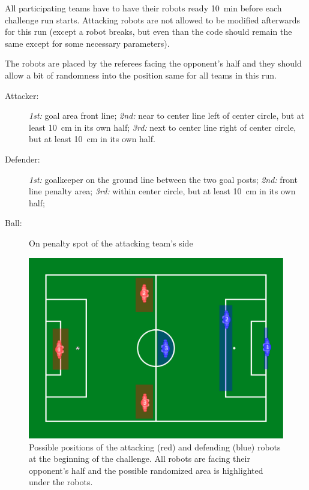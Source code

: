 All participating teams have to have their robots ready \qty{10}{\minute} before each challenge run starts. Attacking robots are not allowed to be modified afterwards for this run (except a robot breaks, but even than the code should remain the same except for some necessary parameters).

The robots are placed by the referees facing the opponent's half and they should allow a bit of randomness into the position same for all teams in this run.
\begin{description}
	\item[Attacker:] \textit{1st:} goal area front line; \textit{2nd:} near to center line left of center circle, but at least \qty{10}{\cm} in its own half; \textit{3rd:} next to center line right of center circle, but at least \qty{10}{\cm} in its own half.
	\item[Defender:] \textit{1st:} goalkeeper on the ground line between the two goal posts; \textit{2nd:} front line penalty area; \textit{3rd:} within center circle, but at least \qty{10}{\cm} in its own half; 
	\item[Ball:] On penalty spot of the attacking team's side
\end{description}

\begin{figure}[hb!]
	\begin{center}
		\leavevmode
		\includegraphics[width=1\columnwidth]{figs/dbhc_initial.pdf}
		\caption{Possible positions of the {\color{red}attacking (red)} and {\color{blue}defending (blue)} robots at the beginning of the challenge. All robots are facing their opponent's half and the possible randomized area is highlighted under the robots.}
		\label{fig:ball_handling_inital_positions}
	\end{center}
\end{figure}

